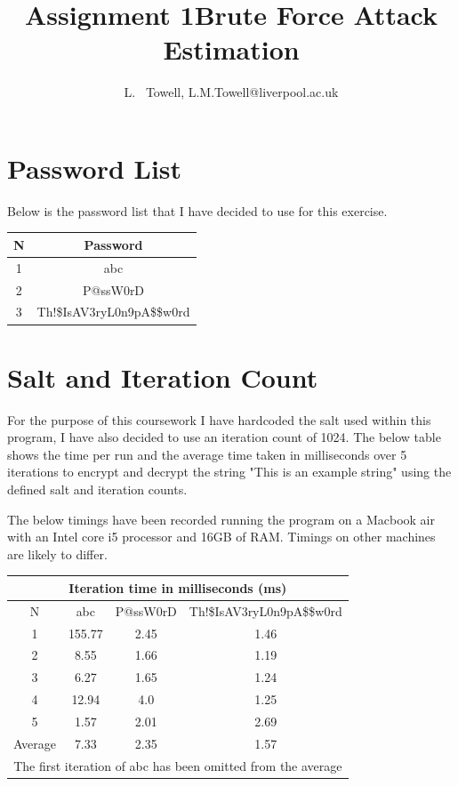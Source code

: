 \documentclass[a4paper, twoside, 11pt]{article}
\author{L. ~Towell, L.M.Towell@liverpool.ac.uk}
\title{Assignment 1\break Brute Force Attack Estimation}
\begin{document}
	\maketitle

\maketitle
\section{Password List}
Below is the password list that I have decided to use for this exercise.
\begin{center}
	\begin{tabular}{ |c|c| } 
	 \hline
	 N & Password \\
	 \hline
	 1 & abc \\ 
	 2 & P@ssW0rD \\ 
	 3 & Th!\$IsAV3ryL0n9pA\$\$w0rd \\ 
	 \hline
	\end{tabular}
\end{center}

\section{Salt and Iteration Count}
For the purpose of this coursework I have hardcoded the salt used within this program, 
I have also decided to use an iteration count of 1024. The below table shows the time per run and the average time
 taken in milliseconds over 5 iterations to encrypt and decrypt the string "This is an example string" using the 
 defined salt and iteration counts.

 The below timings have been recorded running the program on a Macbook air with an Intel core i5 processor and 16GB of RAM.
  Timings on other machines are likely to differ.
 \begin{center}
	\begin{tabular}{ |c|c|c|c| } 
	 \hline
	 \multicolumn{4}{|c|}{Iteration time in milliseconds (ms)} \\
	 \hline
	 N & abc & P@ssW0rD & Th!\$IsAV3ryL0n9pA\$\$w0rd \\
	 \hline
	 1 & 155.77 & 2.45 & 1.46 \\ 
	 2 & 8.55 & 1.66 & 1.19  \\ 
	 3 & 6.27 & 1.65 & 1.24  \\ 
	 4 & 12.94 & 4.0 & 1.25 \\
	 5 & 1.57 & 2.01 & 2.69  \\
	 \hline
	 \hline
	 Average & 7.33 & 2.35 & 1.57  \\
	 \hline
	 \multicolumn{4}{|c|}{The first iteration of abc has been omitted from the average} \\
	 \hline
	\end{tabular}
\end{center}
\end{document}
